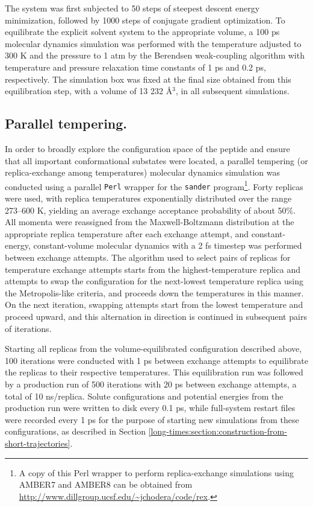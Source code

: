The system was first subjected to 50 steps of steepest descent energy minimization, followed by 1000 steps of conjugate gradient optimization.
To equilibrate the explicit solvent system to the appropriate volume, a 100 ps molecular dynamics simulation was performed with the temperature adjusted to 300 K and the pressure to 1 atm by the Berendsen weak-coupling algorithm \cite{berendsen:1984a} with temperature and pressure relaxation time constants of 1 ps and 0.2 ps, respectively.
The simulation box was fixed at the final size obtained from this equilibration step, with a volume of 13 232 \AA$^3$, in all subsequent simulations.

\subsection{Parallel tempering.}
\label{long-times:section:parallel-tempering}

In order to broadly explore the configuration space of the peptide and ensure that all important conformational substates were located, a parallel tempering (or replica-exchange among temperatures) molecular dynamics simulation \cite{sugita:1999a} was conducted using a parallel {\tt Perl} wrapper for the {\tt sander} program\footnote{A copy of this Perl wrapper to perform replica-exchange simulations using AMBER7 and AMBER8 can be obtained from \url{http://www.dillgroup.ucsf.edu/~jchodera/code/rex}.}.
Forty replicas were used, with replica temperatures exponentially distributed over the range 273--600 K, yielding an average exchange acceptance probability of about 50\%.
All momenta were reassigned from the Maxwell-Boltzmann distribution at the appropriate replica temperature after each exchange attempt, and constant-energy, constant-volume molecular dynamics with a 2 fs timestep was performed between exchange attempts.
The algorithm used to select pairs of replicas for temperature exchange attempts starts from the highest-temperature replica and attempts to swap the configuration for the next-lowest temperature replica using the Metropolis-like criteria, and proceeds down the temperatures in this manner.  On the next iteration, swapping attempts start from the lowest temperature and proceed upward, and this alternation in direction is continued in subsequent pairs of iterations.

Starting all replicas from the volume-equilibrated configuration described above, 100 iterations were conducted with 1 ps between exchange attempts to equilibrate the replicas to their respective temperatures.
This equilibration run was followed by a production run of 500 iterations with 20 ps between exchange attempts, a total of 10 ns/replica.
Solute configurations and potential energies from the production run  were written to disk every 0.1 ps, while full-system restart files were recorded every 1 ps for the purpose of starting new simulations from these configurations, as described in Section \ref{long-times:section:construction-from-short-trajectories}.

